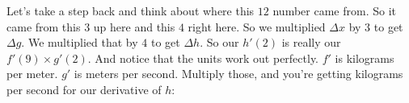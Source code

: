 \documentclass[pdftex, brazil, 12pt, twoside]{article}
\begin{document}
\begin{figure}[H]
  \begin{center}
  \end{center}
\end{figure}

Let's take a step back and think about where
this $12$ number came from.
So it came from this $3$ up here and this $4$ right here.
So we multiplied $\Delta x$ by $3$ to get $\Delta g$.
We multiplied that by $4$ to get $\Delta h$.
So our $h'(2)$ is really our $f'(9) \times g'(2)$.
And notice that the units work out perfectly.
$f'$ is kilograms per meter.
$g'$ is meters per second.
Multiply those, and you're getting kilograms per second
for our derivative of $h$:

\begin{figure}[H]
  \begin{center}
  \end{center}
\end{figure}
\end{document}

